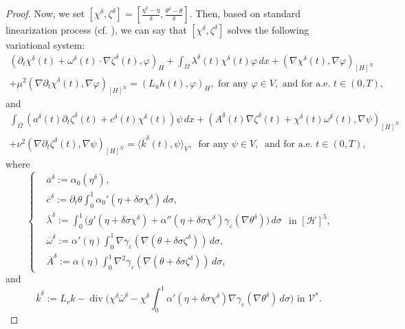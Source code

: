 \documentclass{sinst}
\numberwithin{equation}{section}
\theoremstyle{plain}
\theoremstyle{definition}
\def\sH{\mathscr{H}}
\def\sV{\mathscr{V}}
\DeclareMathOperator{\diver}{div}
\begin{document}
\begin{proof}
  Now, we set $[\chi^\delta, \zeta^\delta] = [\frac{\eta^\delta - \eta}{\delta}, \frac{\theta^\delta - \theta}{\delta}]$. Then, based on standard linearization process (cf. \cite{MR4395725}), we can say that $[\chi^\delta, \zeta^\delta]$ solves the following variational system:
  \begin{gather}
    (\partial_t \chi^\delta(t) + \omega^\delta(t) \cdot \nabla \zeta^\delta(t), \varphi)_H + \int_\Omega \lambda^\delta(t) \chi^\delta(t) \varphi \,dx +(\nabla \chi^\delta(t), \nabla \varphi)_{[H]^N} \label{Gateaux01}
    \\
    + \mu^2 (\nabla \partial_t \chi^\delta(t), \nabla \varphi)_{[H]^N} = (L_u h(t),\varphi)_H, \mbox{ for any } \varphi \in V, \mbox{ and for a.e. } t \in (0,T),
  \end{gather}
  and
  \begin{gather}
    \int_\Omega (a^\delta(t) \partial_t \zeta^\delta(t) + c^\delta(t) \chi^\delta(t)) \psi \,dx + (A^\delta(t) \nabla \zeta^\delta(t) + \chi^\delta(t)\omega^\delta(t), \nabla \psi)_{[H]^N} \label{Gateaux02}
    \\
    + \nu^2(\nabla \partial_t \zeta^\delta(t), \nabla \psi)_{[H]^N} = \langle \overline{k}^\delta(t),\psi \rangle_V, \ \mbox{ for any }  \psi \in V, \ \mbox{ and for a.e. } t \in (0,T),
  \end{gather}
  where
  \begin{equation}
    \left\{ \begin{aligned}
      &\overline{a}^\delta := \alpha_0(\eta^\delta),
      \\
      &\overline{c}^\delta := \partial_t \theta \int_0^1 \alpha_0'(\eta + \delta \sigma \chi^\delta)\,d\sigma,
      \\
      &\overline{\lambda}^\delta := \int_0^1 \bigl(g'(\eta + \delta \sigma \chi^\delta) + \alpha''(\eta + \delta \sigma \chi^\delta) \gamma_\varepsilon(\nabla \theta^\delta)\bigr) \,d\sigma
      \\
      &\overline{\omega}^\delta := \alpha'(\eta) \int_0^1 \nabla \gamma_\varepsilon(\nabla (\theta + \delta \sigma \zeta^\delta)) \,d\sigma,
      \\
      &\overline{A}^\delta := \alpha(\eta) \int_0^1 \nabla^2 \gamma_\varepsilon(\nabla (\theta + \delta \sigma \zeta^\delta)) \,d\sigma,
    \end{aligned} \right. \mbox{ in } [\sH]^5,
  \end{equation}
  and
  \begin{equation}
    \overline{k}^\delta := L_v k - \diver\biggl( \chi^\delta \overline{\omega}^\delta - \chi^\delta \int_0^1 \alpha'(\eta + \delta \sigma \chi^\delta) \nabla \gamma_\varepsilon(\nabla \theta^\delta)\,d\sigma \biggr) \mbox{ in } \sV^*.

\end{equation}
\end{proof}
\end{document}
